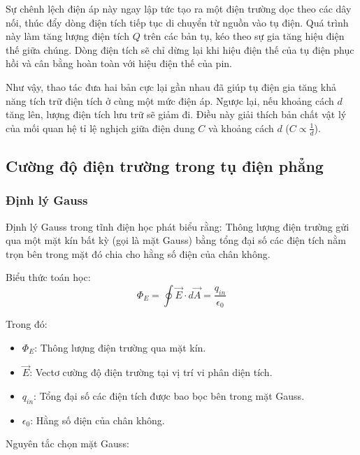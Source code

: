 Sự chênh lệch điện áp này ngay lập tức tạo ra một điện trường dọc theo các dây nối, thúc đẩy dòng điện tích tiếp tục di chuyển từ nguồn vào tụ điện. Quá trình này làm tăng lượng điện tích $Q$ trên các bản tụ, kéo theo sự gia tăng hiệu điện thế giữa chúng. Dòng điện tích sẽ chỉ dừng lại khi hiệu điện thế của tụ điện phục hồi và cân bằng hoàn toàn với hiệu điện thế của pin.

Như vậy, thao tác đưa hai bản cực lại gần nhau đã giúp tụ điện gia tăng khả năng tích trữ điện tích ở cùng một mức điện áp. Ngược lại, nếu khoảng cách $d$ tăng lên, lượng điện tích lưu trữ sẽ giảm đi. Điều này giải thích bản chất vật lý của mối quan hệ tỉ lệ nghịch giữa điện dung $C$ và khoảng cách $d$ ($C \propto \frac{1}{d}$).

\subsection{Cường độ điện trường trong tụ điện phẳng}
\subsubsection{Định lý Gauss}
Định lý Gauss trong tĩnh điện học phát biểu rằng: Thông lượng điện trường gửi qua một mặt kín bất kỳ (gọi là mặt Gauss) bằng tổng đại số các điện tích nằm trọn bên trong mặt đó chia cho hằng số điện của chân không.

Biểu thức toán học:
$$\Phi_E = \oint \vec{E} \cdot d\vec{A} = \frac{q_{in}}{\epsilon_0}$$

Trong đó:
\begin{itemize}
    \item $\Phi_E$: Thông lượng điện trường qua mặt kín.
    \item $\vec{E}$: Vectơ cường độ điện trường tại vị trí vi phân diện tích.
    \item $q_{in}$: Tổng đại số các điện tích được bao bọc bên trong mặt Gauss.
    \item $\epsilon_0$: Hằng số điện của chân không.
\end{itemize}

Nguyên tắc chọn mặt Gauss:


